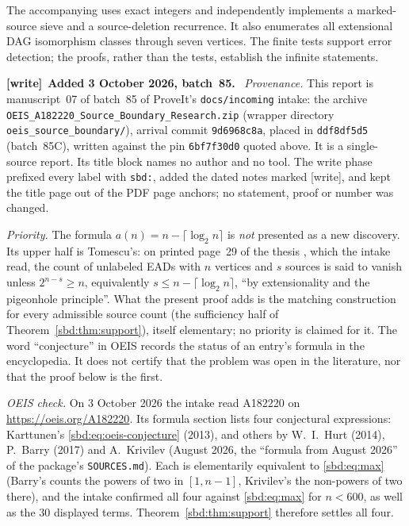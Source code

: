 \documentclass[11pt,a4paper]{article}
\theoremstyle{definition}
\newcommand{\code}[1]{\texttt{\detokenize{#1}}}
\newenvironment{writenote}[1][]{\par\smallskip\begingroup\small
 \noindent\textbf{[write]}\if\relax\detokenize{#1}\relax\else~\textbf{#1.}\fi\ }%
 {\par\endgroup\smallskip}
\begin{document}
The accompanying \code{verify.py} uses exact integers and independently
implements a marked-source sieve and a source-deletion recurrence. It
also enumerates all extensional DAG isomorphism classes through seven
vertices. The finite tests support error detection; the proofs, rather
than the tests, establish the infinite statements.

\begin{writenote}[Added 3 October 2026, batch~85]
\emph{Provenance.} This report is manuscript~07 of batch~85 of ProveIt's
\nolinkurl{docs/incoming} intake: the archive
\nolinkurl{OEIS_A182220_Source_Boundary_Research.zip} (wrapper directory
\nolinkurl{oeis_source_boundary/}), arrival commit \nolinkurl{9d6968c8a}, placed in
\nolinkurl{ddf8df5d5} (batch~85C), written against the pin \nolinkurl{6bf7f30d0}
quoted above. It is a single-source report. Its title block names no
author and no tool. The write phase prefixed every label with
\nolinkurl{sbd:}, added the dated notes marked [write], and kept the title page
out of the PDF page anchors; no statement, proof or number was changed.

\emph{Priority.} The formula $a(n)=n-\lceil\log_2n\rceil$ is \emph{not}
presented as a new discovery. Its upper half is Tomescu's: on printed
page~29 of the thesis \cite{tomescu}, which the intake read, the count of
unlabeled EADs with $n$ vertices and $s$ sources is said to vanish unless
$2^{n-s}\ge n$, equivalently $s\le n-\lceil\log_2n\rceil$, ``by
extensionality and the pigeonhole principle''. What the present proof adds
is the matching construction for every admissible source count (the
sufficiency half of Theorem~\ref{sbd:thm:support}), itself elementary; no
priority is claimed for it. The word ``conjecture'' in OEIS records the
status of an entry's formula in the encyclopedia. It does not certify that
the problem was open in the literature, nor that the proof below is the
first.

\emph{OEIS check.} On 3 October 2026 the intake read A182220 on
\url{https://oeis.org/A182220}. Its formula section lists four conjectural
expressions: Karttunen's \eqref{sbd:eq:oeis-conjecture} (2013), and others
by W.~I.~Hurt (2014), P.~Barry (2017) and A.~Krivilev (August 2026, the
``formula from August 2026'' of the package's \nolinkurl{SOURCES.md}). Each is
elementarily equivalent to \eqref{sbd:eq:max} (Barry's counts the powers of
two in $[1,n-1]$, Krivilev's the non-powers of two there), and the intake
confirmed all four against \eqref{sbd:eq:max} for $n<600$, as well as the
30 displayed terms. Theorem~\ref{sbd:thm:support} therefore settles all
four.


\end{writenote}
\end{document}
